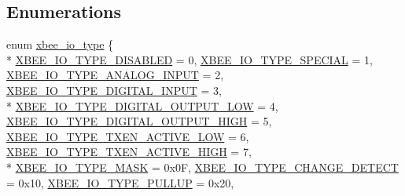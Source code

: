 \subsection*{Enumerations}
\begin{DoxyCompactItemize}
\item 
enum \hyperlink{group__xbee__io_gac23a55c53310f865d9ed2381e331a438}{xbee\-\_\-io\-\_\-type} \{ \\*
\hyperlink{group__xbee__io_ggac23a55c53310f865d9ed2381e331a438ac94eae0e1d6e2f048b7ce9aad2dbb294}{X\-B\-E\-E\-\_\-\-I\-O\-\_\-\-T\-Y\-P\-E\-\_\-\-D\-I\-S\-A\-B\-L\-E\-D} = 0, 
\hyperlink{group__xbee__io_ggac23a55c53310f865d9ed2381e331a438a03494dbb6cd4a96383107366370f0473}{X\-B\-E\-E\-\_\-\-I\-O\-\_\-\-T\-Y\-P\-E\-\_\-\-S\-P\-E\-C\-I\-A\-L} = 1, 
\hyperlink{group__xbee__io_ggac23a55c53310f865d9ed2381e331a438a70bf5092d9f6fdf00cb81b4fd16aeb8b}{X\-B\-E\-E\-\_\-\-I\-O\-\_\-\-T\-Y\-P\-E\-\_\-\-A\-N\-A\-L\-O\-G\-\_\-\-I\-N\-P\-U\-T} = 2, 
\hyperlink{group__xbee__io_ggac23a55c53310f865d9ed2381e331a438a2887707500afd7d22309447fef90d52e}{X\-B\-E\-E\-\_\-\-I\-O\-\_\-\-T\-Y\-P\-E\-\_\-\-D\-I\-G\-I\-T\-A\-L\-\_\-\-I\-N\-P\-U\-T} = 3, 
\\*
\hyperlink{group__xbee__io_ggac23a55c53310f865d9ed2381e331a438a4e6de8188ed6ccfea0d862dc8c36cbbf}{X\-B\-E\-E\-\_\-\-I\-O\-\_\-\-T\-Y\-P\-E\-\_\-\-D\-I\-G\-I\-T\-A\-L\-\_\-\-O\-U\-T\-P\-U\-T\-\_\-\-L\-O\-W} = 4, 
\hyperlink{group__xbee__io_ggac23a55c53310f865d9ed2381e331a438ab62aebd7dfbb2424407a9115fbf55ef1}{X\-B\-E\-E\-\_\-\-I\-O\-\_\-\-T\-Y\-P\-E\-\_\-\-D\-I\-G\-I\-T\-A\-L\-\_\-\-O\-U\-T\-P\-U\-T\-\_\-\-H\-I\-G\-H} = 5, 
\hyperlink{group__xbee__io_ggac23a55c53310f865d9ed2381e331a438a85bc0f69a521fb5c165328ff14cb3c93}{X\-B\-E\-E\-\_\-\-I\-O\-\_\-\-T\-Y\-P\-E\-\_\-\-T\-X\-E\-N\-\_\-\-A\-C\-T\-I\-V\-E\-\_\-\-L\-O\-W} = 6, 
\hyperlink{group__xbee__io_ggac23a55c53310f865d9ed2381e331a438a4a98244656eacb8587c39c6219b02731}{X\-B\-E\-E\-\_\-\-I\-O\-\_\-\-T\-Y\-P\-E\-\_\-\-T\-X\-E\-N\-\_\-\-A\-C\-T\-I\-V\-E\-\_\-\-H\-I\-G\-H} = 7, 
\\*
\hyperlink{group__xbee__io_ggac23a55c53310f865d9ed2381e331a438afb53ffa5963f9677a369d43916807f44}{X\-B\-E\-E\-\_\-\-I\-O\-\_\-\-T\-Y\-P\-E\-\_\-\-M\-A\-S\-K} = 0x0\-F, 
\hyperlink{group__xbee__io_ggac23a55c53310f865d9ed2381e331a438a2f8406584861bbcbd152bac72b6051c8}{X\-B\-E\-E\-\_\-\-I\-O\-\_\-\-T\-Y\-P\-E\-\_\-\-C\-H\-A\-N\-G\-E\-\_\-\-D\-E\-T\-E\-C\-T} = 0x10, 
\hyperlink{group__xbee__io_ggac23a55c53310f865d9ed2381e331a438a6338af6819290605a1c535a610965340}{X\-B\-E\-E\-\_\-\-I\-O\-\_\-\-T\-Y\-P\-E\-\_\-\-P\-U\-L\-L\-U\-P} = 0x20, 

\end{DoxyCompactItemize}
